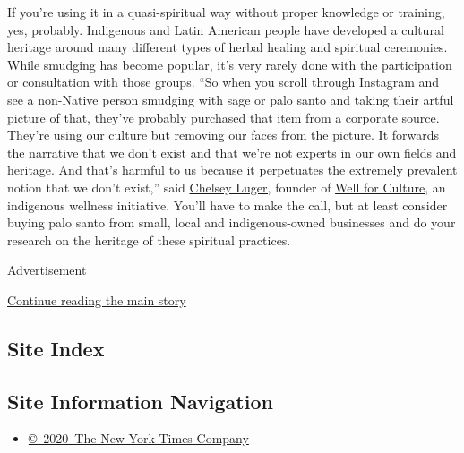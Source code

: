 If you're using it in a quasi-spiritual way without proper knowledge or
training, yes, probably. Indigenous and Latin American people have
developed a cultural heritage around many different types of herbal
healing and spiritual ceremonies. While smudging has become popular,
it's very rarely done with the participation or consultation with those
groups. ``So when you scroll through Instagram and see a non-Native
person smudging with sage or palo santo and taking their artful picture
of that, they've probably purchased that item from a corporate source.
They're using our culture but removing our faces from the picture. It
forwards the narrative that we don't exist and that we're not experts in
our own fields and heritage. And that's harmful to us because it
perpetuates the extremely prevalent notion that we don't exist,'' said
\href{http://chelseyluger.com/}{Chelsey Luger,} founder of
\href{https://www.wellforculture.com/}{Well for Culture}, an indigenous
wellness initiative. You'll have to make the call, but at least consider
buying palo santo from small, local and indigenous-owned businesses and
do your research on the heritage of these spiritual practices.

Advertisement

\protect\hyperlink{after-bottom}{Continue reading the main story}

\hypertarget{site-index}{%
\subsection{Site Index}\label{site-index}}

\hypertarget{site-information-navigation}{%
\subsection{Site Information
Navigation}\label{site-information-navigation}}

\begin{itemize}
\tightlist
\item
  \href{https://help.nytimes3xbfgragh.onion/hc/en-us/articles/115014792127-Copyright-notice}{©~2020~The
  New York Times Company}
\end{itemize}

